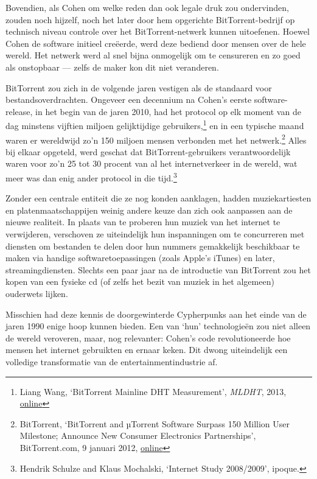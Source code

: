 \documentclass[
  a5paper,
  smalldemyvopaper,11pt,twoside,onecolumn,openright,extrafontsizes]{memoir}
\begin{document}
Bovendien, als Cohen om welke reden dan ook legale druk zou ondervinden,
zouden noch hijzelf, noch het later door hem opgerichte
BitTorrent-bedrijf op technisch niveau controle over het
BitTorrent-netwerk kunnen uitoefenen. Hoewel Cohen de software initieel
creëerde, werd deze bediend door mensen over de hele wereld. Het netwerk
werd al snel bijna onmogelijk om te censureren en zo goed als onstopbaar
--- zelfs de maker kon dit niet veranderen.

BitTorrent zou zich in de volgende jaren vestigen als de standaard voor
bestandsoverdrachten. Ongeveer een decennium na Cohen's eerste
software-release, in het begin van de jaren 2010, had het protocol op
elk moment van de dag minstens vijftien miljoen gelijktijdige
gebruikers,\footnote{Liang Wang, `BitTorrent Mainline DHT Measurement',
  \emph{MLDHT}, 2013,
  \href{https://www.cl.cam.ac.uk//~lw525/MLDHT/}{online}} en in een
typische maand waren er wereldwijd zo'n 150 miljoen mensen verbonden met
het netwerk.\footnote{BitTorrent, `BitTorrent and µTorrent Software
  Surpass 150 Million User Milestone; Announce New Consumer Electronics
  Partnerships', BitTorrent.com, 9 januari 2012,
  \href{https://web.archive.org/web/20140326102305/http://www.bittorrent.com/intl/es/company/about/ces_2012_150m_users}{online}}
Alles bij elkaar opgeteld, werd geschat dat BitTorrent-gebruikers
verantwoordelijk waren voor zo'n 25 tot 30 procent van al het
internetverkeer in de wereld, wat meer was dan enig ander protocol in
die tijd.\footnote{Hendrik Schulze and Klaus Mochalski, `Internet Study
  2008/2009', ipoque.}

Zonder een centrale entiteit die ze nog konden aanklagen, hadden
muziekartiesten en platenmaatschappijen weinig andere keuze dan zich ook
aanpassen aan de nieuwe realiteit. In plaats van te proberen hun muziek
van het internet te verwijderen, verschoven ze uiteindelijk hun
inspanningen om te concurreren met diensten om bestanden te delen door
hun nummers gemakkelijk beschikbaar te maken via handige
softwaretoepassingen (zoals Apple's iTunes) en later, streamingdiensten.
Slechts een paar jaar na de introductie van BitTorrent zou het kopen van
een fysieke cd (of zelfs het bezit van muziek in het algemeen) ouderwets
lijken.

Misschien had deze kennis de doorgewinterde Cypherpunks aan het einde
van de jaren 1990 enige hoop kunnen bieden. Een van `hun' technologieën
zou niet alleen de wereld veroveren, maar, nog relevanter: Cohen's code
revolutioneerde hoe mensen het internet gebruikten en ernaar keken. Dit
dwong uiteindelijk een volledige transformatie van de
entertainmentindustrie af.
\end{document}
